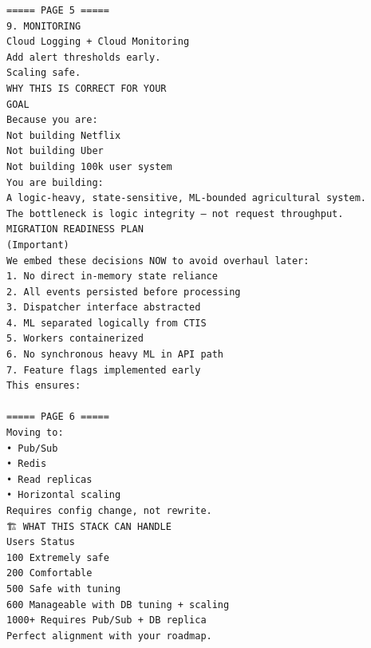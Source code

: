 \documentclass{article}
\begin{document}
\begin{verbatim}
===== PAGE 5 =====
9. MONITORING
Cloud Logging + Cloud Monitoring
Add alert thresholds early.
Scaling safe.
WHY THIS IS CORRECT FOR YOUR
GOAL
Because you are:
Not building Netflix
Not building Uber
Not building 100k user system
You are building:
A logic-heavy, state-sensitive, ML-bounded agricultural system.
The bottleneck is logic integrity — not request throughput.
MIGRATION READINESS PLAN
(Important)
We embed these decisions NOW to avoid overhaul later:
1. No direct in-memory state reliance
2. All events persisted before processing
3. Dispatcher interface abstracted
4. ML separated logically from CTIS
5. Workers containerized
6. No synchronous heavy ML in API path
7. Feature flags implemented early
This ensures:

===== PAGE 6 =====
Moving to:
• Pub/Sub
• Redis
• Read replicas
• Horizontal scaling
Requires config change, not rewrite.
🏗 WHAT THIS STACK CAN HANDLE
Users Status
100 Extremely safe
200 Comfortable
500 Safe with tuning
600 Manageable with DB tuning + scaling
1000+ Requires Pub/Sub + DB replica
Perfect alignment with your roadmap.
\end{verbatim}
\end{document}
